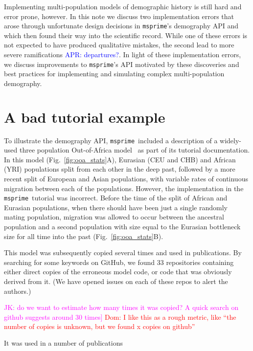 \documentclass{article}
\newcommand{\msprime}[0]{\texttt{msprime}}
\newcommand{\aprcomment}[1]{{\textcolor{blue}{APR: #1}}}
\newcommand{\dncomment}[1]{{\textcolor{red}{Dom: #1}}}
\newcommand{\jkcomment}[1]{{\textcolor{magenta}{JK: #1}}}
\begin{document}
Implementing multi-population models of demographic history is still hard and error
prone, however. In this note we discuss two implementation errors that arose through
unfortunate design decisions in \msprime's demography API and which then found their way
into the scientific record. While one of these errors is not expected to have produced qualitative
mistakes, the second lead to more severe ramifications \aprcomment{departures?}. In light of these
implementation errors, we discuss improvements to \msprime's API motivated by these
discoveries and best practices for implementing and simulating complex multi-population
demography.

\section{A bad tutorial example}

To illustrate the demography API, \msprime\ included a description of a widely-used
three population Out-of-Africa model~\citep{gutenkunst2009inferring}
as part of its tutorial documentation. In this model (Fig.~\ref{fig:ooa_stats}A),
Eurasian (CEU and CHB) and African (YRI) populations split from each other in the deep past,
followed by a more recent split of European and Asian populations, with variable rates of
continuous migration between each of the populations. However, the implementation in the
\msprime\ tutorial was incorrect. Before the time of the split of African and Eurasian
populations, when there should have been just a single randomly mating population, migration was
allowed to occur between the ancestral population and a second population with size equal to
the Eurasian bottleneck size for all time into the past (Fig.~\ref{fig:ooa_stats}B).

This model was subsequently copied
several times and used in publications. By searching for some keywords on
GitHub, we found 33 repositories containing either direct copies of the
erroneous model code, or code that was obviously derived from it.
(We have opened issues on each of these repos to alert the authors.)


\jkcomment{do we want to estimate how
many times it was copied? A quick search on github suggests around 30
times]} \dncomment{I like this as a rough metric, like ``the number of copies
is unknown, but we found x copies on github''}

It was used in a number of publications
~\citep{martin2017human,albers2020dating,kelleher2019inferring,tong2020population,hubisz2019mapping,
overcast2019integrated,zhou2018popdemog,pfaffelhuber2020choose}
\end{document}
